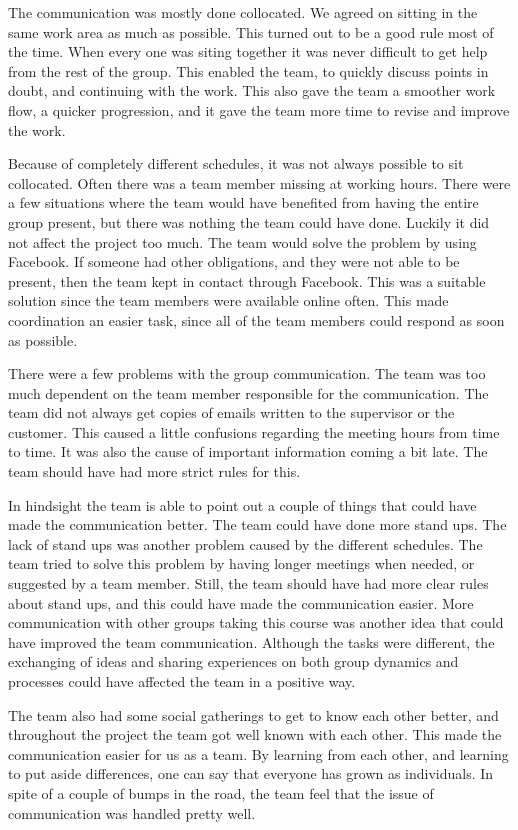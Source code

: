 The communication was mostly done collocated. We agreed on sitting in the same work area as much as possible. This turned out to be a good rule most of the time. 
When every one was siting together it was never difficult to get help from the rest of the group. This enabled the team, to quickly discuss points in doubt, and continuing with the work. This also gave the team a smoother work flow, a quicker progression, and it gave the team more time to revise and improve the work.

Because of completely different schedules, it was not always possible to sit collocated. Often there was a team member missing at working hours. There were a few situations where the team would have benefited from having the entire group present, but there was nothing the team could have done. Luckily it did not affect the project too much. The team would solve the problem by using Facebook. If someone had other obligations, and they were not able to be present, then the team kept in contact through Facebook. This was a suitable solution since the team members were available online often. This made coordination an easier task, since all of the team members could respond as soon as possible. 

There were a few problems with the group communication. The team was too much dependent on the team member responsible for the communication. The team did not always get copies of emails written to the supervisor or the customer. This caused a little confusions regarding the meeting hours from time to time. It was also the cause of important information coming a bit late. The team should have had more strict rules for this.

In hindsight the team is able to point out a couple of things that could have made the communication better. The team could have done more stand ups. The lack of stand ups was another problem caused by the different schedules. The team tried to solve this problem by having longer meetings when needed, or suggested by a team member. Still, the team should have had more clear rules about stand ups, and this could have made the communication easier. 
More communication with other groups taking this course was another idea that could have improved the team communication.
Although the tasks were different, the exchanging of ideas and sharing experiences on both group dynamics and processes could have affected the team in a positive way. 

The team also had some social gatherings to get to know each other better, and throughout the project the team got well known with each other. This made the communication easier for us as a team. By learning from each other, and learning to put aside differences, one can say that everyone has grown as individuals. In spite of a couple of bumps in the road, the team feel that the issue of communication was handled pretty well.

